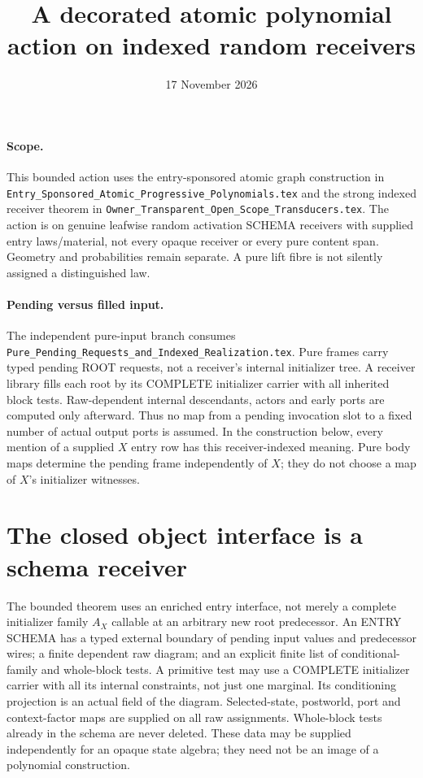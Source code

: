 \documentclass[11pt]{article}
\title{A decorated atomic polynomial action on indexed random receivers}
\date{17 November 2026}
\begin{document}
\maketitle
\paragraph{Scope.} This bounded action uses the entry-sponsored atomic graph construction in \texttt{Entry\_Sponsored\_Atomic\_Progressive\_Polynomials.tex} and the strong indexed receiver theorem in \texttt{Owner\_Transparent\_Open\_Scope\_Transducers.tex}. The action is on genuine leafwise random activation SCHEMA receivers with supplied entry laws/material, not every opaque receiver or every pure content span. Geometry and probabilities remain separate. A pure lift fibre is not silently assigned a distinguished law.

\paragraph{Pending versus filled input.}
The independent pure-input branch consumes \texttt{Pure\_Pending\_Requests\_and\_Indexed\_Realization.tex}. Pure frames carry typed pending ROOT requests, not a receiver's internal initializer tree. A receiver library fills each root by its COMPLETE initializer carrier with all inherited block tests. Raw-dependent internal descendants, actors and early ports are computed only afterward. Thus no map from a pending invocation slot to a fixed number of actual output ports is assumed. In the construction below, every mention of a supplied $X$ entry row has this receiver-indexed meaning. Pure body maps determine the pending frame independently of $X$; they do not choose a map of $X$'s initializer witnesses.

\section{The closed object interface is a schema receiver}
The bounded theorem uses an enriched entry interface, not merely a complete initializer family $A_X$ callable at an arbitrary new root predecessor. An ENTRY SCHEMA has a typed external boundary of pending input values and predecessor wires; a finite dependent raw diagram; and an explicit finite list of conditional-family and whole-block tests. A primitive test may use a COMPLETE initializer carrier with all its internal constraints, not just one marginal. Its conditioning projection is an actual field of the diagram. Selected-state, postworld, port and context-factor maps are supplied on all raw assignments. Whole-block tests already in the schema are never deleted. These data may be supplied independently for an opaque state algebra; they need not be an image of a polynomial construction.
\end{document}
